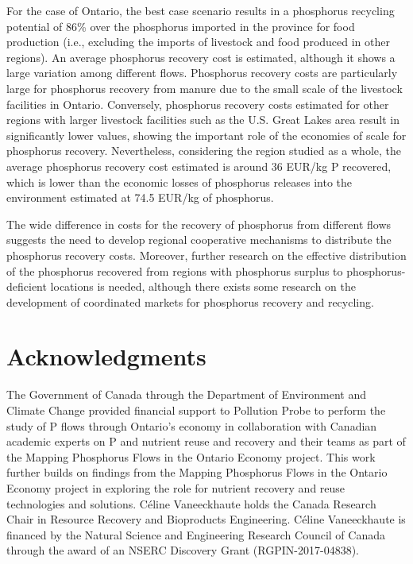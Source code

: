 \documentclass[]{elsarticle}
\begin{document}
For the case of Ontario, the best case scenario results in a phosphorus recycling potential of 86\% over the phosphorus imported in the province for food production (i.e., excluding the imports of livestock and food produced in other regions). An average phosphorus recovery cost is estimated, although it shows a large variation among different flows. Phosphorus recovery costs are particularly large for phosphorus recovery from manure due to the small scale of the livestock facilities in Ontario. Conversely, phosphorus recovery costs estimated for other regions with larger livestock facilities such as the U.S. Great Lakes area result in significantly lower values, showing the important role of the economies of scale for phosphorus recovery. Nevertheless, considering the region studied as a whole, the average phosphorus recovery cost estimated is around 36 EUR/kg P recovered, which is lower than the economic losses of phosphorus releases into the environment estimated at 74.5 EUR/kg of phosphorus.

The wide difference in costs for the recovery of phosphorus from different flows suggests the need to develop regional cooperative mechanisms to distribute the phosphorus recovery costs. Moreover, further research on the effective distribution of the phosphorus recovered from regions with phosphorus surplus to phosphorus-deficient locations is needed, although there exists some research on the development of coordinated markets for phosphorus recovery and recycling.

\section{Acknowledgments}
The Government of Canada through the Department of Environment and Climate Change provided financial support to Pollution Probe to perform the study of P flows through Ontario’s economy in collaboration with Canadian academic experts on P and nutrient reuse and recovery and their teams as part of the Mapping Phosphorus Flows in the Ontario Economy project. This work further builds on findings from the Mapping Phosphorus Flows in the Ontario Economy project in exploring the role for nutrient recovery and reuse technologies and solutions. Céline Vaneeckhaute holds the Canada Research Chair in Resource Recovery and Bioproducts Engineering. Céline Vaneeckhaute is financed by the Natural Science and Engineering Research Council of Canada through the award of an NSERC Discovery Grant (RGPIN-2017-04838).
\end{document}
